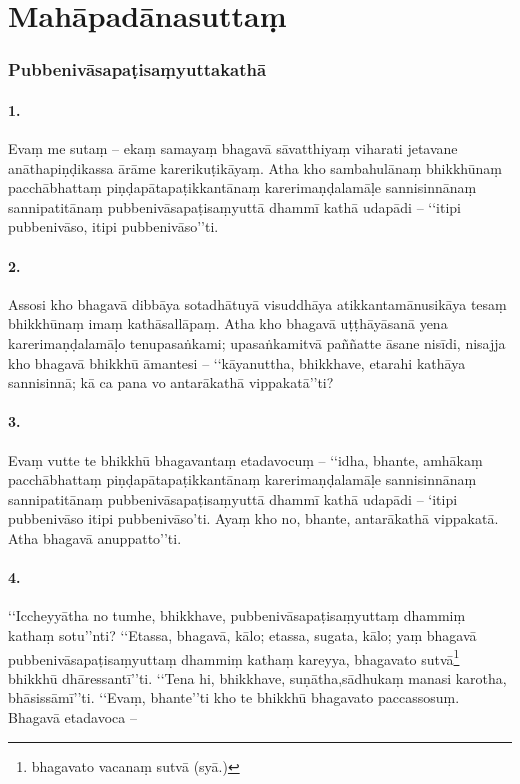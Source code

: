 \section{Mahāpadānasuttaṃ}

\subsubsection{Pubbenivāsapaṭisaṃyuttakathā}

\paragraph{1.} Evaṃ me sutaṃ – ekaṃ samayaṃ bhagavā sāvatthiyaṃ viharati jetavane anāthapiṇḍikassa ārāme karerikuṭikāyaṃ. Atha kho sambahulānaṃ bhikkhūnaṃ pacchābhattaṃ piṇḍapātapaṭikkantānaṃ karerimaṇḍalamāḷe sannisinnānaṃ sannipatitānaṃ pubbenivāsapaṭisaṃyuttā dhammī kathā udapādi – ‘‘itipi pubbenivāso, itipi pubbenivāso’’ti.

\paragraph{2.} Assosi kho bhagavā dibbāya sotadhātuyā visuddhāya atikkantamānusikāya tesaṃ bhikkhūnaṃ imaṃ kathāsallāpaṃ. Atha kho bhagavā uṭṭhāyāsanā yena karerimaṇḍalamāḷo tenupasaṅkami; upasaṅkamitvā paññatte āsane nisīdi, nisajja kho bhagavā bhikkhū āmantesi – ‘‘kāyanuttha, bhikkhave, etarahi kathāya sannisinnā; kā ca pana vo antarākathā vippakatā’’ti?

\paragraph{3.} Evaṃ vutte te bhikkhū bhagavantaṃ etadavocuṃ – ‘‘idha, bhante, amhākaṃ pacchābhattaṃ piṇḍapātapaṭikkantānaṃ karerimaṇḍalamāḷe sannisinnānaṃ sannipatitānaṃ pubbenivāsapaṭisaṃyuttā dhammī kathā udapādi – ‘itipi pubbenivāso itipi pubbenivāso’ti. Ayaṃ kho no, bhante, antarākathā vippakatā. Atha bhagavā anuppatto’’ti.

\paragraph{4.} ‘‘Iccheyyātha no tumhe, bhikkhave, pubbenivāsapaṭisaṃyuttaṃ dhammiṃ kathaṃ sotu’’nti? ‘‘Etassa, bhagavā, kālo; etassa, sugata, kālo; yaṃ bhagavā pubbenivāsapaṭisaṃyuttaṃ dhammiṃ kathaṃ kareyya, bhagavato sutvā\footnote{bhagavato vacanaṃ sutvā (syā.)} bhikkhū dhāressantī’’ti. ‘‘Tena hi, bhikkhave, suṇātha,sādhukaṃ manasi karotha, bhāsissāmī’’ti. ‘‘Evaṃ, bhante’’ti kho te bhikkhū bhagavato paccassosuṃ. Bhagavā etadavoca –

